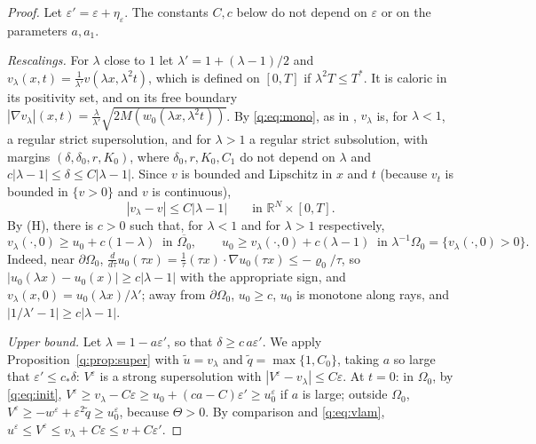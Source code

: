 \documentclass[11pt]{amsart}
\theoremstyle{definition}
\theoremstyle{remark}
\newcommand{\ve}{\varepsilon}
\newcommand{\R}{\mathbb{R}}
\begin{document}
\begin{proof}
Let $\ve'=\ve+\eta_\ve$. The constants $C,c$ below do not depend on $\ve$ or on the
parameters $a,a_1$.

\emph{Rescalings.} For $\lambda$ close to $1$ let $\lambda'=1+(\lambda-1)/2$ and
$v_\lambda(x,t)=\frac1{\lambda'}v(\lambda x,\lambda^2t)$, which is defined on $[0,T]$ if
$\lambda^2T\le T^*$. It is caloric in its positivity set, and on its free boundary
$|\nabla v_\lambda|(x,t)=\frac\lambda{\lambda'}\sqrt{2M(w_0(\lambda x,\lambda^2t))}$. By \eqref{q:eq:mono},
as in \cite[Section~2]{FernandezBonderWolanski2004}, $v_\lambda$ is, for $\lambda<1$, a regular
strict supersolution, and for $\lambda>1$ a regular strict subsolution, with margins
$(\delta,\delta_0,r,K_0)$, where $\delta_0,r,K_0,C_1$ do not depend on $\lambda$ and
$c|\lambda-1|\le\delta\le C|\lambda-1|$. Since $v$ is bounded and Lipschitz in $x$ and $t$
(because $v_t$ is bounded in $\{v>0\}$ and $v$ is continuous),
\begin{equation}\label{q:eq:vlam}
|v_\lambda-v|\le C|\lambda-1|\qquad\text{in }\R^N\times[0,T].
\end{equation}
By (H), there is $c>0$ such that, for $\lambda<1$ and for $\lambda>1$ respectively,
\begin{equation}\label{q:eq:init}
v_\lambda(\cdot,0)\ge u_0+c(1-\lambda)\ \text{ in }\overline{\Omega_0},\qquad
u_0\ge v_\lambda(\cdot,0)+c(\lambda-1)\ \text{ in }\lambda^{-1}\Omega_0=\{v_\lambda(\cdot,0)>0\}.
\end{equation}
Indeed, near $\partial\Omega_0$, $\frac{d}{d\tau}u_0(\tau x)=\frac1\tau(\tau x)\cdot\nabla u_0(\tau x)\le-\varrho_0/\tau$,
so $|u_0(\lambda x)-u_0(x)|\ge c|\lambda-1|$ with the appropriate sign, and
$v_\lambda(x,0)=u_0(\lambda x)/\lambda'$; away from $\partial\Omega_0$, $u_0\ge c$, $u_0$ is monotone
along rays, and $|1/\lambda'-1|\ge c|\lambda-1|$.

\emph{Upper bound.} Let $\lambda=1-a\ve'$, so that $\delta\ge c\,a\ve'$. We apply
Proposition~\ref{q:prop:super} with $\tilde u=v_\lambda$ and $\tilde q=\max\{1,C_0\}$, taking $a$ so
large that $\ve'\le c_*\delta$: $V^\ve$ is a strong supersolution with
$|V^\ve-v_\lambda|\le C\ve$. At $t=0$: in $\Omega_0$, by \eqref{q:eq:init},
$V^\ve\ge v_\lambda-C\ve\ge u_0+(ca-C)\ve'\ge u_0^\ve$ if $a$ is large; outside $\Omega_0$,
$V^\ve\ge-w^\ve+\ve^2\tilde q\ge u_0^\ve$, because $\Theta>0$. By comparison and
\eqref{q:eq:vlam}, $u^\ve\le V^\ve\le v_\lambda+C\ve\le v+C\ve'$.


\end{proof}
\end{document}
